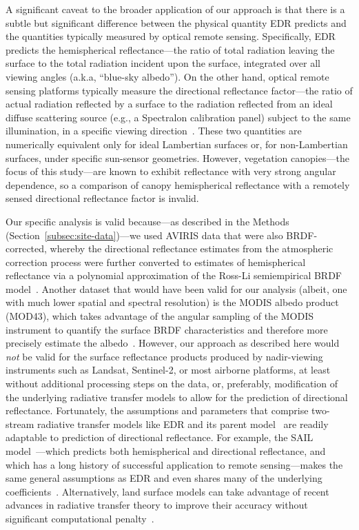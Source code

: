 A significant caveat to the broader application of our approach is that there is a subtle but significant difference between the physical quantity EDR predicts and the quantities typically measured by optical remote sensing.
Specifically, EDR predicts the hemispherical reflectance---the ratio of total radiation leaving the surface to the total radiation incident upon the surface, integrated over all viewing angles (a.k.a, ``blue-sky albedo'').
On the other hand, optical remote sensing platforms typically measure the directional reflectance factor---the ratio of actual radiation reflected by a surface to the radiation reflected from an ideal diffuse scattering source (e.g., a Spectralon calibration panel) subject to the same illumination, in a specific viewing direction~\citep{schaepman-strub2006reflectance}.
These two quantities are numerically equivalent only for ideal Lambertian surfaces or, for non-Lambertian surfaces, under specific sun-sensor geometries.
However, vegetation canopies---the focus of this study---are known to exhibit reflectance with very strong angular dependence, so a comparison of canopy hemispherical reflectance with a remotely sensed directional reflectance factor is invalid.

Our specific analysis is valid because---as described in the Methods (Section~\ref{subsec:site-data})---we used AVIRIS data that were also BRDF-corrected,
whereby the directional reflectance estimates from the atmospheric correction process were further converted to estimates of hemispherical reflectance via a polynomial approximation of the Ross-Li semiempirical BRDF model~\citep{lucht2000algorithm}.
Another dataset that would have been valid for our analysis (albeit, one with much lower spatial and spectral resolution) is the MODIS albedo product (MOD43), which takes advantage of the angular sampling of the MODIS instrument to quantify the surface BRDF characteristics and therefore more precisely estimate the albedo~\citep{wang2004using, schaaf2015mcd43a1}.
However, our approach as described here would \emph{not} be valid for the surface reflectance products produced by nadir-viewing instruments such as Landsat, Sentinel-2, or most airborne platforms, at least without additional processing steps on the data,
or, preferably, modification of the underlying radiative transfer models to allow for the prediction of directional reflectance.
Fortunately, the assumptions and parameters that comprise two-stream radiative transfer models like EDR and its parent model~\citep{sellers1985canopy} are readily adaptable to prediction of directional reflectance.
For example, the SAIL model~\citep{verhoef1984light, verhoef2007coupled}---which predicts both hemispherical and directional reflectance, and which has a long history of successful application to remote sensing---makes the same general assumptions as EDR and even shares many of the underlying coefficients~\citep{yuan2017reexamination}.
Alternatively, land surface models can take advantage of recent advances in radiative transfer theory to improve their accuracy without significant computational penalty~\citep[e.g.,][]{hogan_2018_fast}.

